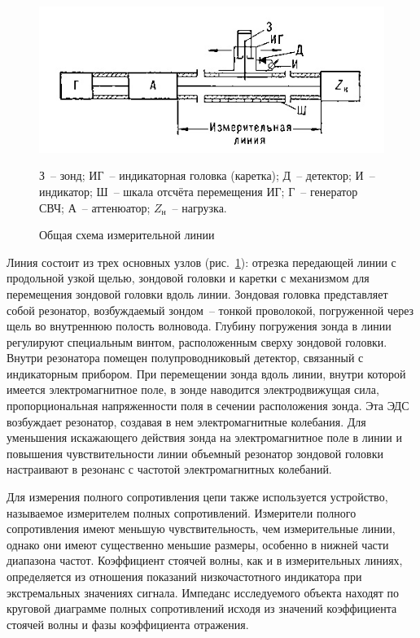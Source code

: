 \documentclass[pscyr,titlepage]{hedreport}
\newcommand{\Pic}[1]{\ref{pic#1}}
\newcommand{\pic}[1]{рис.~\Pic{#1}}
\begin{document}
  \begin{figure}[!t]
    \center
    \includegraphics{line}
    \caption{Общая схема измерительной линии}
    \label{picline}
    { \small
      З~-- зонд; ИГ~-- индикаторная головка (каретка); Д~-- детектор; И~--
      индикатор; Ш~-- шкала отсчёта перемещения ИГ; Г~-- генератор СВЧ; А~--
      аттенюатор; \( Z_\text{н} \)~-- нагрузка.
    }
  \end{figure}

  Линия состоит из трех основных узлов (\pic{line}): отрезка передающей линии с
  продольной узкой щелью, зондовой головки и каретки с механизмом для
  перемещения зондовой головки вдоль линии. Зондовая головка представляет собой
  резонатор, возбуждаемый зондом~-- тонкой проволокой, погруженной через щель во
  внутреннюю полость волновода. Глубину погружения зонда в линии регулируют
  специальным винтом, расположенным сверху зондовой головки. Внутри резонатора
  помещен полупроводниковый детектор, связанный с индикаторным прибором. При
  перемещении зонда вдоль линии, внутри которой имеется электромагнитное поле,
  в зонде наводится электродвижущая сила, пропорциональная напряженности поля в
  сечении расположения зонда. Эта ЭДС возбуждает резонатор, создавая в нем
  электромагнитные колебания. Для уменьшения искажающего действия зонда на
  электромагнитное поле в линии и повышения чувствительности линии объемный
  резонатор зондовой головки настраивают в резонанс с частотой электромагнитных
  колебаний.
  
  \bigskip

  Для измерения полного сопротивления цепи также используется устройство,
  называемое измерителем полных сопротивлений. Измерители полного сопротивления
  имеют меньшую чувствительность, чем измерительные линии, однако они имеют
  существенно меньшие размеры, особенно в нижней части диапазона частот.
  Коэффициент стоячей волны, как и в измерительных линиях, определяется из
  отношения показаний низкочастотного индикатора при экстремальных значениях
  сигнала. Импеданс исследуемого объекта находят по круговой диаграмме полных
  сопротивлений исходя из значений коэффициента стоячей волны и фазы
  коэффициента отражения.
\end{document}
